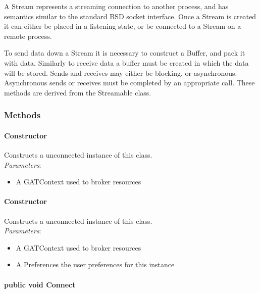 \documentclass[$Date: 2003/06/26 19:29:31 $]{glabarticle}
\begin{document}
A Stream represents a streaming connection to another process, and has
semantics similar to the standard BSD socket interface.  Once a Stream
is created it can either be placed in a listening state, or be
connected to a Stream on a remote process.

To send data down a Stream it is necessary to construct a Buffer, and
pack it with data.  Similarly to receive data a buffer must be created
in which the data will be stored.  Sends and receives may either be
blocking, or asynchronous.  Asynchronous sends or receives must be
completed by an appropriate call.  These methods are derived from the
Streamable class.


\subsubsection{Methods}

\paragraph{Constructor}

Constructs a unconnected instance of this class. \\

\textit{Parameters}:
\begin{itemize}
\item[] A GATContext used to broker resources
\end{itemize}

\paragraph{Constructor}

Constructs a unconnected instance of this class. \\

\textit{Parameters}:
\begin{itemize}
\item[] A GATContext used to broker resources
\item[] A Preferences the user preferences for this instance
\end{itemize}

\paragraph{public void Connect}
\end{document}
